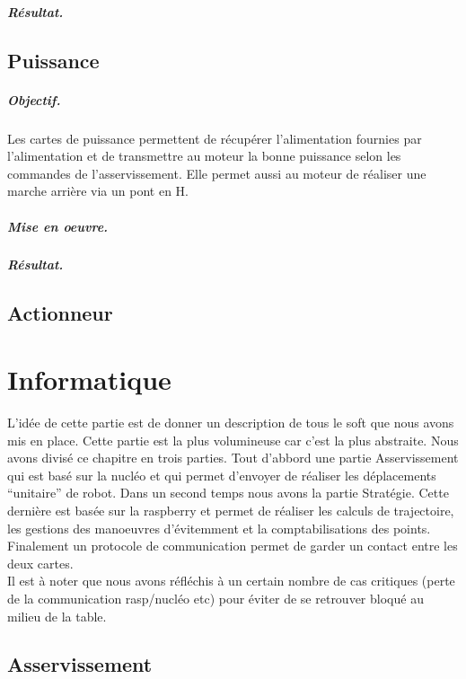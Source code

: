 \documentclass[a4paper,10pt]{report}
\begin{document}
\begin{spacing}{1.5}
\paragraph{Résultat.}
\section{Puissance}
\paragraph{Objectif.} Les cartes de puissance permettent de récupérer
l'alimentation fournies par l'alimentation et de transmettre au moteur la bonne
puissance selon les commandes de l'asservissement. Elle permet aussi au moteur
de réaliser une marche arrière via un pont en H.
\paragraph{Mise en oeuvre.}

\paragraph{Résultat.}

\section{Actionneur}

\chapter{Informatique}
L'idée de cette partie est de donner un description de tous le soft que nous
avons mis en place. Cette partie est la plus volumineuse car c'est la plus
abstraite. Nous avons divisé ce chapitre en trois parties. Tout d'abbord une
partie Asservissement qui est basé sur la nucléo et qui permet d'envoyer de
réaliser les déplacements ``unitaire'' de robot. Dans un second temps nous avons
la partie Stratégie. Cette dernière est basée sur la raspberry et permet de
réaliser les calculs de trajectoire, les gestions des manoeuvres d'évitemment et
la comptabilisations des points. Finalement un protocole de communication permet
de garder un contact entre les deux cartes. \\
Il est à noter que nous avons réfléchis à un certain nombre de cas critiques
(perte de la communication rasp/nucléo etc) pour éviter de se retrouver bloqué
au milieu de la table.
\section{Asservissement}

\end{spacing}
\end{document}
